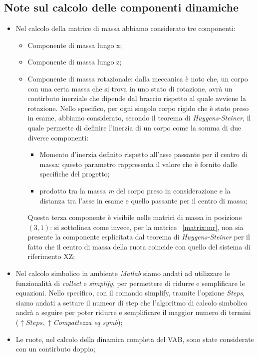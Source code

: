 \subsection{Note sul calcolo delle componenti dinamiche}
\begin{itemize}
	\item Nel calcolo della matrice di massa abbiamo considerato tre componenti:
	\begin{itemize}
		\item Componente di massa lungo x;
		\item Componente di massa lungo z;
		\item Componente di massa rotazionale: dalla meccanica è noto che, un corpo con una certa massa che si trova in uno stato di rotazione, avrà un contirbuto inerziale che dipende dal braccio rispetto al quale avviene la rotazione.
		Nello specifico, per ogni singolo corpo rigido che è stato preso in esame, abbiamo considerato, secondo il teorema di \textit{Huygens-Steiner}, il quale permette di definire l'inerzia di un corpo come la somma di due diverse componenti:
		\begin{itemize}
			\item Momento d'inerzia definito rispetto all'asse passante per il centro di massa: questo parametro rappresenta il valore che è fornito dalle specifiche del progetto;
			\item prodotto tra la massa \textit{m} del corpo preso in considerazione e la distanza tra l'asse in esame e quello passante per il centro di massa;
		\end{itemize}
		Questa terza componente è visibile nelle matrici di massa in posizione $(3, 1)$: si sottolinea come invece, per la matrice ~\ref{matrix:mr}, non sia presente la componente esplicitata dal teorema di \textit{Huygens-Steiner} per il fatto che il centro di massa della ruota coincide con quello del sistema di riferimento XZ;
 	\end{itemize}
 	\item Nel calcolo simbolico in ambiente \textit{Matlab} siamo andati ad utilizzare le funzionalità di \textit{collect} e \textit{simplify}, per permettere di ridurre e semplificare le equazioni. Nello specifico, con il comando simplify, tramite l'opzione \textit{Steps}, siamo andati a settare il numeor di step che l'algoritmo di calcolo simbolico andrà a seguire per poter ridurre e semplificare il maggior numero di termini ($\uparrow Steps, \uparrow $\textit{Compattezza eq symb});
 	
 	\item Le ruote, nel calcolo della dinamica completa del VAB, sono state considerate con un contirbuto doppio;
 	

\end{itemize}
